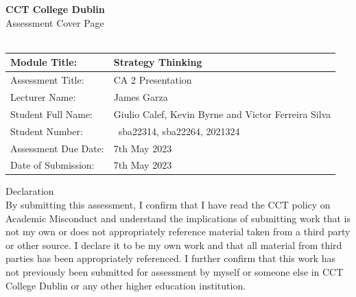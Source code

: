 \documentclass{article}
\begin{document}
\begin{titlepage}
    \begin{center}
        \vspace*{1cm}
        \LARGE\textbf{CCT College Dublin}\\
        \vspace{0.5cm}
        \Large Assessment Cover Page\\
        \hrulefill\\
        \vspace{1cm}
        \begin{tabular}{|l|p{7cm}|}
        
        \hline
        Module Title:& Strategy Thinking \\
        \hline
        Assessment Title:& CA 2 Presentation\\
        \hline
        Lecturer Name:& James Garza\\
        \hline
        Student Full Name:& Giulio Calef, Kevin Byrne and Victor Ferreira Silva \\
        \hline
        Student Number:& sba22314, sba22264, 2021324 \\
        \hline
        Assessment Due Date:& 7th May 2023\\
        \hline
        Date of Submission:& 7th May 2023\\
        \hline
        \end{tabular}
        
        \vspace{1cm}
        \Large Declaration\\
        \vspace{0.5cm}
        \normalsize By submitting this assessment, I confirm that I have read the CCT policy on Academic Misconduct and understand the implications of submitting work that is not my own or does not appropriately reference material taken from a third party or other source. I declare it to be my own work and that all material from third parties has been appropriately referenced. I further confirm that this work has not previously been submitted for assessment by myself or someone else in CCT College Dublin or any other higher education institution.\\
    \end{center}
\end{titlepage}
\end{document}
